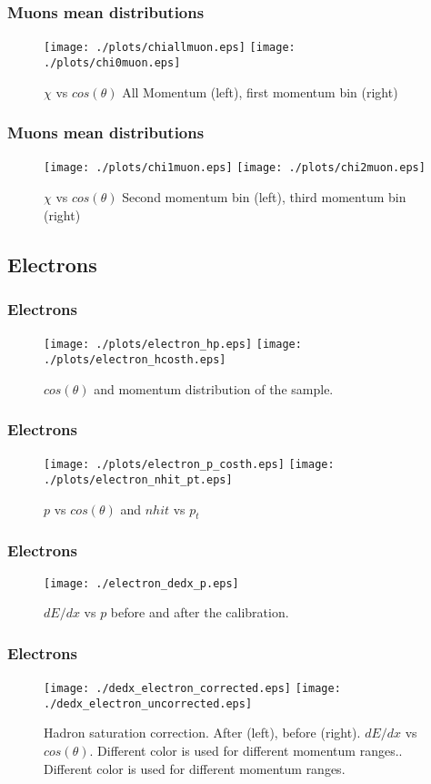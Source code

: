 \documentclass{beamer}
\begin{document}
\begin{frame}\frametitle{Muons mean distributions}
\begin{figure}[!htp]
\centering
\texttt{[image: ./plots/chiallmuon.eps]}
\texttt{[image: ./plots/chi0muon.eps]}
\caption{$\chi$ vs $cos(\theta)$ All Momentum (left), first momentum bin (right)}
\end{figure}
\end{frame}

\begin{frame}\frametitle{Muons mean distributions}
\begin{figure}[!htp]
\centering
\texttt{[image: ./plots/chi1muon.eps]}
\texttt{[image: ./plots/chi2muon.eps]}
\caption{$\chi$ vs $cos(\theta)$ Second momentum bin (left), third momentum bin (right)}
\end{figure}
\end{frame}


\subsection{Electrons}
\begin{frame}\frametitle{Electrons}
\begin{figure}
\texttt{[image: ./plots/electron\_hp.eps]} 
\texttt{[image: ./plots/electron\_hcosth.eps]} 
\caption{$cos(\theta)$ and momentum distribution of the sample.}
\end{figure}
\end{frame}

\begin{frame}\frametitle{Electrons}
\begin{figure}
\texttt{[image: ./plots/electron\_p\_costh.eps]} 
\texttt{[image: ./plots/electron\_nhit\_pt.eps]} 
\caption{$p$ vs $cos(\theta)$ and $nhit$ vs $p_{t}$}
\end{figure}
\end{frame}

\begin{frame}\frametitle{Electrons}
\begin{figure}
\texttt{[image: ./electron\_dedx\_p.eps]} 
\caption{$dE/dx$ vs $p$ before and after the calibration.}
\end{figure}
\end{frame}

\begin{frame}\frametitle{Electrons}
\begin{figure}
\texttt{[image: ./dedx\_electron\_corrected.eps]} 
\texttt{[image: ./dedx\_electron\_uncorrected.eps]} 
\caption{Hadron saturation correction. After (left), before (right). $dE/dx$ vs $cos(\theta)$. Different color is used for different momentum ranges.. Different color is used for different momentum ranges.}
\end{figure}
\end{frame}
\end{document}
